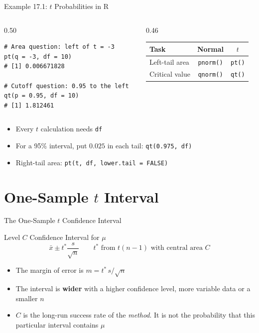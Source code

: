 \documentclass[aspectratio=169,10pt]{beamer}
\begin{document}
\begin{frame}[fragile]{Example 17.1: $t$ Probabilities in R}
\begin{columns}[T]
\begin{column}{0.50\textwidth}
\begin{lstlisting}[style=Rstyle]
# Area question: left of t = -3
pt(q = -3, df = 10)
# [1] 0.006671828

# Cutoff question: 0.95 to the left
qt(p = 0.95, df = 10)
# [1] 1.812461
\end{lstlisting}
\end{column}
\begin{column}{0.46\textwidth}
\begin{center}
\small
\begin{tabular}{lcc}
\toprule
\textbf{Task} & \textbf{Normal} & \textbf{$t$} \\
\midrule
Left-tail area & \texttt{pnorm()} & \texttt{pt()} \\
Critical value & \texttt{qnorm()} & \texttt{qt()} \\
\bottomrule
\end{tabular}
\end{center}
\end{column}
\end{columns}

\vspace{0.3cm}
\begin{itemize}
  \item Every $t$ calculation needs \texttt{df}
  \item For a 95\% interval, put $0.025$ in each tail: \texttt{qt(0.975, df)}
  \item Right-tail area: \texttt{pt(t, df, lower.tail = FALSE)}
\end{itemize}
\end{frame}

\section{One-Sample $t$ Interval}

\begin{frame}{The One-Sample $t$ Confidence Interval}
\begin{block}{Level $C$ Confidence Interval for $\mu$}
$$\bar{x}\pm t^*\frac{s}{\sqrt{n}} \qquad t^* \text{ from } t(n-1) \text{ with central area } C$$
\end{block}

\vspace{0.2cm}
\begin{itemize}
  \setlength{\itemsep}{0.15cm}
  \item The margin of error is $m=t^*\,s/\sqrt{n}$
  \item The interval is \textbf{wider} with a higher confidence level, more variable data or a smaller $n$
  \item $C$ is the long-run success rate of the \emph{method}. It is not the probability that this particular interval contains $\mu$
\end{itemize}
\end{frame}
\end{document}

